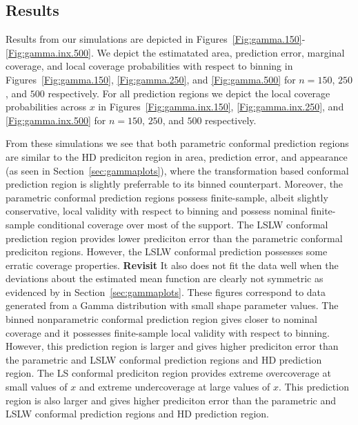 \documentclass[11pt]{article}\usepackage[]{graphicx}\usepackage[]{color}
\begin{document}
\newpage
\subsection{Results}
\label{sec:Gamma-Results}

Results from our simulations are depicted in 
Figures~\ref{Fig:gamma.150}-\ref{Fig:gamma.inx.500}.  
We depict the estimatated area, prediction error, marginal coverage, and 
local coverage probabilities with respect to binning in 
Figures~\ref{Fig:gamma.150}, \ref{Fig:gamma.250}, and \ref{Fig:gamma.500} 
for $n = 150$, $250$, and $500$ respectively.  For all prediction 
regions we depict the local coverage probabilities across $x$ in
Figures~\ref{Fig:gamma.inx.150}, \ref{Fig:gamma.inx.250}, and 
\ref{Fig:gamma.inx.500} for $n = 150$, $250$, and $500$ respectively.

From these simulations we see that both parametric conformal prediction 
regions are similar to the HD prediciton region in area, prediction error, and 
appearance (as seen in Section~\ref{sec:gammaplots}), where the transformation 
based conformal prediction region is slightly preferrable to its binned counterpart.  
Moreover, the parametric conformal prediction regions possess finite-sample, 
albeit slightly conservative, local validity with respect to binning and 
possess nominal finite-sample conditional coverage over most of the support. 
The LSLW conformal prediction region provides lower prediciton error than the 
parametric conformal prediciton regions.  However, the LSLW conformal 
prediction possesses some erratic coverage properties.  
{\bf Revisit} It also does not fit the data well when the deviations about the 
estimated mean function are clearly not symmetric as evidenced by 
in Section~\ref{sec:gammaplots}.  These figures correspond to data generated 
from a Gamma distribution with small shape parameter values.  
The binned nonparametric conformal prediction region gives closer to nominal 
coverage and it possesses finite-sample local validity with respect to 
binning.  However, this prediction region is larger and gives higher 
prediciton error than the parametric and LSLW conformal prediction 
regions and HD prediction region.  The LS conformal prediciton region 
provides extreme overcoverage at small values of $x$ and extreme 
undercoverage at large values of $x$.  This prediction region is also larger 
and gives higher prediciton error than the parametric and LSLW conformal 
prediction regions and HD prediction region.
\end{document}
